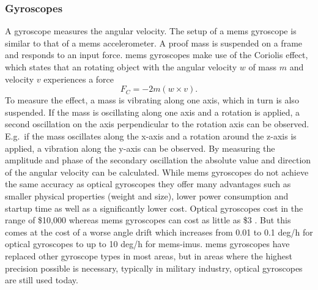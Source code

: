 \subsubsection{ Gyroscopes}
A gyroscope measures the angular velocity.
The setup of a \gls{mems} gyroscope is similar to that of a \gls{mems} accelerometer.
A proof mass is suspended on a frame and responds to an input force.
\gls{mems} gyroscopes make use of the Coriolis effect, which states that an rotating object with the angular velocity $w$ of mass $m$ and velocity $v$ experiences a force
\[ F_C = -2m(w\times v). \]
To measure the effect, a mass is vibrating along one axis, which in turn is also suspended.
If the mass is oscillating along one axis and a rotation is applied, a second oscillation on the axis perpendicular to the rotation axis can be observed.
E.g.\ if the mass oscillates along the x-axis and a rotation around the z-axis is applied, a vibration along the y-axis can be observed.
By measuring the amplitude and phase of the secondary oscillation the absolute value and direction of the angular velocity can be calculated.
While \gls{mems} gyroscopes do not achieve the same accuracy as optical gyroscopes they offer many advantages such as smaller physical properties (weight and size), lower power consumption and startup time as well as a significantly lower cost.
Optical gyroscopes cost in the range of \$10,000 whereas \gls{mems} gyroscopes can cost as little as \$3 \cite{Perlmutter2016}.
But this comes at the cost of a worse angle drift which increases from 0.01 to 0.1 deg/h for optical gyroscopes to up to 10 deg/h for \gls{mems}-\gls{imu}s.
\gls{mems} gyroscopes have replaced other gyroscope types in most areas, but in areas where the highest precision possible is necessary, typically in military industry, optical gyroscopes are still used today.

